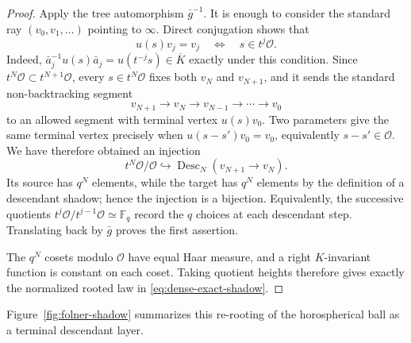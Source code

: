 \documentclass[11pt]{amsart}
\theoremstyle{definition}
\theoremstyle{plain}
\newcommand{\Fq}{\mathbb F_q}
\newcommand{\cO}{\mathcal O}
\newcommand{\bK}{\overline K}
\newcommand{\Desc}{\operatorname{Desc}}
\begin{document}
\begin{proof}
Apply the tree automorphism \(\bar g^{-1}\).  It is enough to consider the
standard ray \((v_0,v_1,\ldots)\) pointing to \(\infty\).  Direct conjugation
shows that
\[
u(s)v_j=v_j\quad\Longleftrightarrow\quad s\in t^j\cO.
\]
Indeed,
\(\bar a_j^{-1}u(s)\bar a_j=u(t^{-j}s)\in\bK\) exactly under this condition.
Since \(t^N\cO\subset t^{N+1}\cO\), every \(s\in t^N\cO\) fixes both \(v_N\)
and \(v_{N+1}\), and it sends the
standard non-backtracking segment
\[
v_{N+1}\to v_N\to v_{N-1}\to\cdots\to v_0
\]
to an allowed segment with terminal vertex \(u(s)v_0\).  Two parameters give
the same terminal vertex precisely when
\(u(s-s')v_0=v_0\), equivalently \(s-s'\in\cO\).  We have therefore obtained
an injection
\[
t^N\cO/\cO\hookrightarrow\Desc_N(v_{N+1}\to v_N).
\]
Its source has \(q^N\) elements, while the target has \(q^N\) elements by the
definition of a descendant shadow; hence the injection is a bijection.
Equivalently, the successive quotients
\(t^j\cO/t^{j-1}\cO\simeq\Fq\) record the \(q\) choices at each descendant
step.  Translating back by \(\bar g\) proves the first assertion.

The \(q^N\) cosets modulo \(\cO\) have equal Haar measure, and a right
\(K\)-invariant function is constant on each coset.  Taking quotient heights
therefore gives exactly the normalized rooted law in
\eqref{eq:dense-exact-shadow}.
\end{proof}

Figure~\ref{fig:folner-shadow} summarizes this re-rooting of the horospherical
ball as a terminal descendant layer.
\end{document}
